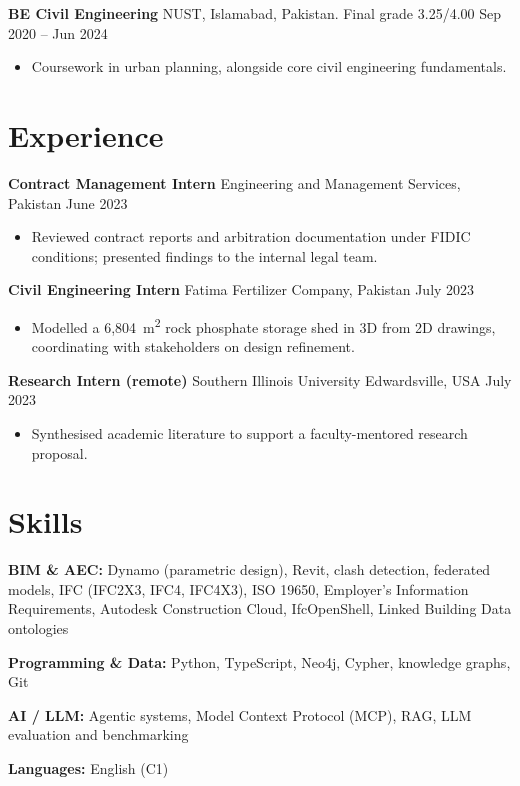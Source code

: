 \documentclass[a4paper,10.5pt]{article}
\newcommand{\datefill}{\dotfill}
\newcommand{\entry}[3]{\vspace{2.5pt}\noindent\textbf{#1} \textbar{} #2 \datefill{} #3\par\vspace{0.5pt}}
\newcommand{\skillrow}[2]{\noindent\textbf{#1:} #2\par\vspace{1pt}}
\begin{document}
\entry{BE Civil Engineering}{NUST, Islamabad, Pakistan. Final grade 3.25/4.00}{Sep 2020 -- Jun 2024}
\begin{itemize}
  \item Coursework in urban planning, alongside core civil engineering fundamentals.
\end{itemize}

\section{Experience}
\entry{Contract Management Intern}{Engineering and Management Services, Pakistan}{June 2023}
\begin{itemize}
  \item Reviewed contract reports and arbitration documentation under FIDIC
        conditions; presented findings to the internal legal team.
\end{itemize}

\entry{Civil Engineering Intern}{Fatima Fertilizer Company, Pakistan}{July 2023}
\begin{itemize}
  \item Modelled a 6,804~m\textsuperscript{2} rock phosphate storage shed in 3D from
        2D drawings, coordinating with stakeholders on design refinement.
\end{itemize}

\entry{Research Intern (remote)}{Southern Illinois University Edwardsville, USA}{July 2023}
\begin{itemize}
  \item Synthesised academic literature to support a faculty-mentored research proposal.
\end{itemize}

\section{Skills}

\skillrow{BIM \& AEC}{Dynamo (parametric design), Revit, clash detection, federated models, IFC (IFC2X3, IFC4, IFC4X3), ISO 19650, Employer's Information Requirements, Autodesk Construction Cloud, IfcOpenShell, Linked Building Data ontologies}
\skillrow{Programming \& Data}{Python, TypeScript, Neo4j, Cypher, knowledge graphs, Git}
\skillrow{AI / LLM}{Agentic systems, Model Context Protocol (MCP), RAG, LLM evaluation and benchmarking}

\skillrow{Languages}{English (C1)}
\end{document}
